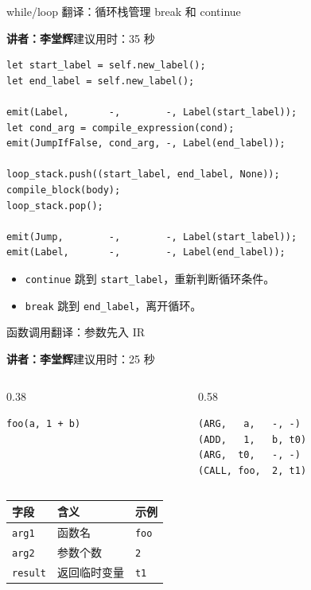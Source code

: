 \documentclass[aspectratio=169]{ctexbeamer}
\newcommand{\speaker}[2]{%
    \vspace{-0.4em}
    \begin{flushright}
        \scriptsize\color{mainblue}\textbf{讲者：#1}\quad 建议用时：#2
    \end{flushright}
    \vspace{-0.7em}
}
\begin{document}
\begin{frame}[fragile]{while/loop 翻译：循环栈管理 break 和 continue}
    \speaker{李堂辉}{35 秒}
    \begin{lstlisting}[style=tinycode]
let start_label = self.new_label();
let end_label = self.new_label();

emit(Label,       -,        -, Label(start_label));
let cond_arg = compile_expression(cond);
emit(JumpIfFalse, cond_arg, -, Label(end_label));

loop_stack.push((start_label, end_label, None));
compile_block(body);
loop_stack.pop();

emit(Jump,        -,        -, Label(start_label));
emit(Label,       -,        -, Label(end_label));
    \end{lstlisting}
    \vspace{-0.4em}
    \begin{itemize}
        \item \texttt{continue} 跳到 \texttt{start\_label}，重新判断循环条件。
        \item \texttt{break} 跳到 \texttt{end\_label}，离开循环。
    \end{itemize}
\end{frame}

\begin{frame}[fragile]{函数调用翻译：参数先入 IR}
    \speaker{李堂辉}{25 秒}
    \begin{columns}[T]
    \begin{column}{0.38\textwidth}
        \begin{lstlisting}[style=code]
foo(a, 1 + b)
        \end{lstlisting}
    \end{column}
    \begin{column}{0.58\textwidth}
        \begin{lstlisting}[style=code]
(ARG,   a,   -, -)
(ADD,   1,   b, t0)
(ARG,  t0,   -, -)
(CALL, foo,  2, t1)
        \end{lstlisting}
    \end{column}
    \end{columns}
    \vspace{0.2em}
    \begin{table}
    \centering
    \small
    \begin{tabular}{lll}
        \toprule
        \textbf{字段} & \textbf{含义} & \textbf{示例} \\
        \midrule
        \texttt{arg1} & 函数名 & \texttt{foo} \\
        \texttt{arg2} & 参数个数 & \texttt{2} \\
        \texttt{result} & 返回临时变量 & \texttt{t1} \\
        \bottomrule
    \end{tabular}
    \end{table}
\end{frame}
\end{document}
